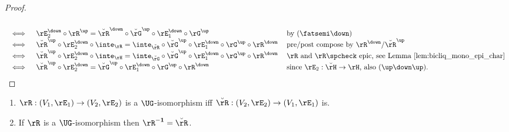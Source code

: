 \documentclass{article}
\begin{document}
\begin{proof}
\[\begin{tabular}{lll}
\\ $\iff$ &
$\rE_2^\down \circ \rR^\up = \breve{\rR}^\down \circ \breve{\rG}^\up \circ \rE_1^\down \circ \rG^\up$
& by $(\fatsemi\down)$
\\ $\iff$ &
$\breve{\rR}^\up \circ \rE_2^\down \circ \inte_\rR = \inte_{\breve{\rR}} \circ \breve{\rG}^\up \circ \rE_1^\down \circ \rG^\up \circ \rR^\down$
& pre/post compose by $\rR^\down$/$\breve{\rR}^\up$
\\ $\iff$ &
$\breve{\rR}^\up \circ \rE_2^\down \circ \inte_\rH = \inte_{\breve{\rG}} \circ \breve{\rG}^\up \circ \rE_1^\down \circ \rG^\up \circ \rR^\down$
& $\rR$ and $\rR\spcheck$ epic, see Lemma \ref{lem:bicliq_mono_epi_char}
\\ $\iff$ &
$\breve{\rR}^\up \circ \rE_2^\down = \breve{\rG}^\up \circ \rE_1^\down \circ \rG^\up \circ \rR^\down$
& since $\rE_2 : \breve{\rH} \to \rH$, also $(\up\down\up)$.
\end{tabular}
\]
\end{proof}


\smallskip


\begin{lemma}
\label{lem:inverse_ug_iso_is_converse}
\item
\begin{enumerate}
\item
$\rR : (V_1,\rE_1) \to (V_2,\rE_2)$ is a $\UG$-isomorphism iff $\breve{\rR} : (V_2,\rE_2) \to (V_1,\rE_1)$ is.
\item
If $\rR$ is a $\UG$-isomorphism then $\rR^{\bf-1} = \breve{\rR}$.
\end{enumerate}
\end{lemma}
\end{document}
